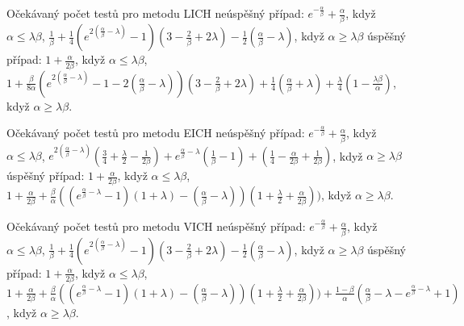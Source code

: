 \documentclass[a4paper,12pt]{article}
\begin{document}
Očekávaný počet testů pro metodu LICH\newline 
neúspěšný případ:\newline 
\phantom{---}$e^{-\frac {\alpha}{\beta}}+\frac {\alpha}{\beta}$, když  $
\alpha\le\lambda\beta$, \newline 
\phantom{---}$\frac 1{\beta}+\frac 14(e^{2(\frac {\alpha}{\beta}-
\lambda )}-1)(3-\frac 2{\beta}+2\lambda )-\frac 12(\frac {\alpha}{
\beta}-\lambda )$, když $\alpha\ge\lambda\beta$\newline 
úspěšný případ:\newline 
\phantom{---}$1+\frac {\alpha}{2\beta}$, když $\alpha\le\lambda
\beta$, \newline 
\phantom{---}$1+\frac {\beta}{8\alpha}(e^{2(\frac {\alpha}{\beta}
-\lambda )}-1-2(\frac {\alpha}{\beta}-\lambda ))(3-\frac 2{\beta}
+2\lambda )+\frac 14(\frac {\alpha}{\beta}+\lambda )+\frac {\lambda}
4(1-\frac {\lambda\beta}{\alpha})$, 
když $\alpha\ge\lambda\beta$.

Očekávaný počet testů pro metodu EICH\newline 
neúspěšný případ:\newline 
\phantom{---}$e^{-\frac {\alpha}{\beta}}+\frac {\alpha}{\beta}$, když  $
\alpha\le\lambda\beta$, \newline 
\phantom{---}$e^{2(\frac {\alpha}{\beta}-\lambda )}(\frac 34+\frac {
\lambda}2-\frac 1{2\beta})+e^{\frac {\alpha}{\beta}-\lambda}(\frac 
1{\beta}-1)+(\frac 14-\frac {\alpha}{2\beta}+\frac 1{2\beta})$, když $
\alpha\ge\lambda\beta$\newline 
úspěšný případ:\newline 
\phantom{---}$1+\frac {\alpha}{2\beta}$, když $\alpha\le\lambda
\beta$, \newline 
\phantom{---}$1+\frac {\alpha}{2\beta}+\frac {\beta}{\alpha}((e^{\frac {
\alpha}{\beta}-\lambda}-1)(1+\lambda )-(\frac {\alpha}{\beta}-\lambda 
))(1+\frac {\lambda}2+\frac {\alpha}{2\beta}))$, když $\alpha\ge
\lambda\beta$.

Očekávaný počet testů pro metodu VICH\newline 
neúspěšný případ:\newline 
\phantom{---}$e^{-\frac {\alpha}{\beta}}+\frac {\alpha}{\beta}$, když  $
\alpha\le\lambda\beta$, \newline 
\phantom{---}$\frac 1{\beta}+\frac 14(e^{2(\frac {\alpha}{\beta}-
\lambda )}-1)(3-\frac 2{\beta}+2\lambda )-\frac 12(\frac {\alpha}{
\beta}-\lambda )$, když $\alpha\ge\lambda\beta$\newline 
úspěšný případ:\newline 
\phantom{---}$1+\frac {\alpha}{2\beta}$, když $\alpha\le\lambda
\beta$, \newline 
\phantom{---}$1+\frac {\alpha}{2\beta}+\frac {\beta}{\alpha}((e^{\frac {
\alpha}{\beta}-\lambda}-1)(1+\lambda )-(\frac {\alpha}{\beta}-\lambda 
))(1+\frac {\lambda}2+\frac {\alpha}{2\beta}))+\frac {1-\beta}{\alpha}
(\frac {\alpha}{\beta}-\lambda -e^{\frac {\alpha}{\beta}-\lambda}
+1)$, 
když $\alpha\ge\lambda\beta$.
\end{document}
